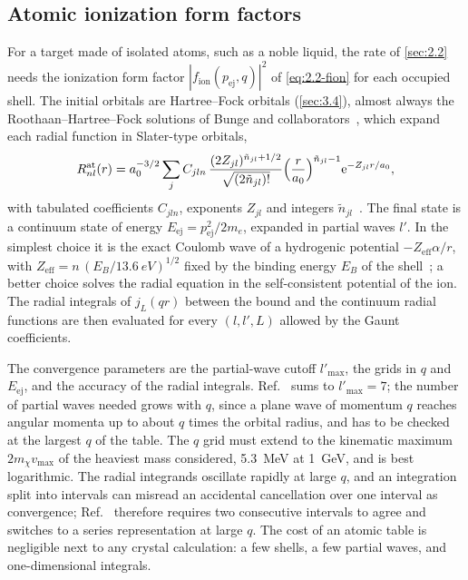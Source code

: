 \subsection{Atomic ionization form factors}

For a target made of isolated atoms, such as a noble liquid, the rate of \cref{sec:2.2} needs the ionization form factor $|f_{\mathrm{ion}}(p_{\mathrm{ej}},q)|^2$ of \cref{eq:2.2-fion} for each occupied shell. The initial orbitals are Hartree--Fock orbitals (\cref{sec:3.4}), almost always the Roothaan--Hartree--Fock solutions of Bunge and collaborators~\cite{bunge1993roothaan}, which expand each radial function in Slater-type orbitals,
\begin{equation}
  R^{\mathrm{at}}_{nl}(r) = a_0^{-3/2}\sum_j C_{jln}\,\frac{(2Z_{jl})^{\tilde n_{jl}+1/2}}{\sqrt{(2\tilde n_{jl})!}}\Bigl(\frac{r}{a_0}\Bigr)^{\tilde n_{jl}-1}\mathrm{e}^{-Z_{jl}r/a_0} ,
  \label{eq:E.7-sto}
\end{equation}
with tabulated coefficients $C_{jln}$, exponents $Z_{jl}$ and integers $\tilde n_{jl}$~\cite[Eq.~(B33)]{catena2020atomic}. The final state is a continuum state of energy $E_{\mathrm{ej}} = p_{\mathrm{ej}}^2/2m_e$, expanded in partial waves $l'$. In the simplest choice it is the exact Coulomb wave of a hydrogenic potential $-Z_{\mathrm{eff}}\alpha/r$, with $Z_{\mathrm{eff}} = n\,(E_B/\SI{13.6}{eV})^{1/2}$ fixed by the binding energy $E_B$ of the shell~\cite[Eqs.~(B34) and~(B35)]{catena2020atomic}; a better choice solves the radial equation in the self-consistent potential of the ion. The radial integrals of $j_L(qr)$ between the bound and the continuum radial functions are then evaluated for every $(l, l', L)$ allowed by the Gaunt coefficients.

The convergence parameters are the partial-wave cutoff $l'_{\mathrm{max}}$, the grids in $q$ and $E_{\mathrm{ej}}$, and the accuracy of the radial integrals. Ref.~\cite[footnote~11]{catena2020atomic} sums to $l'_{\mathrm{max}} = 7$; the number of partial waves needed grows with $q$, since a plane wave of momentum $q$ reaches angular momenta up to about $q$ times the orbital radius, and has to be checked at the largest $q$ of the table. The $q$ grid must extend to the kinematic maximum $2m_\chi v_{\mathrm{max}}$ of the heaviest mass considered, \SI{5.3}{MeV} at \SI{1}{GeV}, and is best logarithmic. The radial integrands oscillate rapidly at large $q$, and an integration split into intervals can misread an accidental cancellation over one interval as convergence; Ref.~\cite[Appendix~B\,5]{catena2020atomic} therefore requires two consecutive intervals to agree and switches to a series representation at large $q$. The cost of an atomic table is negligible next to any crystal calculation: a few shells, a few partial waves, and one-dimensional integrals.

